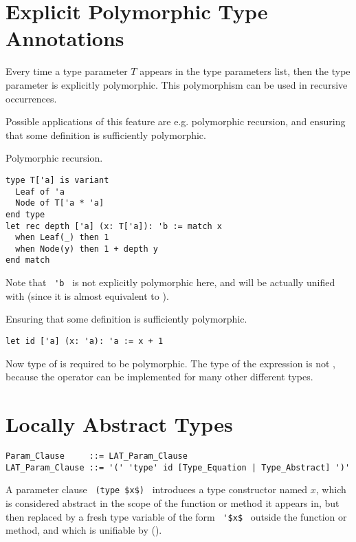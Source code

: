 \section{Explicit Polymorphic Type Annotations}
\label{sec:explicit-polymorphic-type-annotations}

Every time a type parameter $T$ appears in the type parameters list, then the type parameter is explicitly polymorphic. This polymorphism can be used in recursive occurrences. 

Possible applications of this feature are e.g. polymorphic recursion, and ensuring that some definition is sufficiently polymorphic.

\example Polymorphic recursion.
\begin{lstlisting}
type T['a] is variant
  Leaf of 'a
  Node of T['a * 'a]
end type
let rec depth ['a] (x: T['a]): 'b := match x
  when Leaf(_) then 1
  when Node(y) then 1 + depth y
end match
\end{lstlisting}
Note that ~\lstinline!'b!~ is not explicitly polymorphic here, and will be actually unified with  (since it is almost equivalent to ). 

\example Ensuring that some definition is sufficiently polymorphic.
\begin{lstlisting}
let id ['a] (x: 'a): 'a := x + 1 
\end{lstlisting}
Now type of  is required to be polymorphic. The type of the expression  is not , because the operator \code{+} can be implemented for many other different types.





\section{Locally Abstract Types}
\label{sec:locally-abstract-types}

\syntax\begin{lstlisting}
Param_Clause     ::= LAT_Param_Clause
LAT_Param_Clause ::= '(' 'type' id [Type_Equation | Type_Abstract] ')'
\end{lstlisting}

A parameter clause ~\lstinline!(type $x$)!~ introduces a type constructor named $x$, which is considered abstract in the scope of the function or method it appears in, but then replaced by a fresh type variable of the form ~\lstinline!'$x$!~ outside the function or method, and which is unifiable by ().





